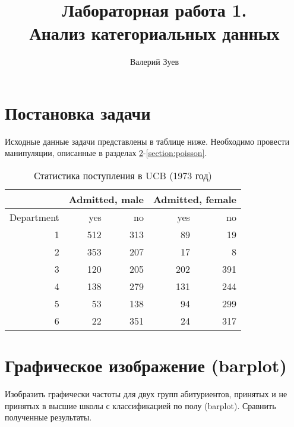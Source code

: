 \documentclass[a4paper,12pt]{article}
\begin{document}
\title{Лабораторная работа 1. \\
     Анализ категориальных данных}
\author{Валерий Зуев}
\maketitle

\setcounter{section}{-1}

\section{Постановка задачи}

Исходные данные задачи представлены в таблице ниже.
Необходимо провести манипуляции, описанные в разделах \ref{section:barplot}-\ref{section:poisson}.

\begin{table}[ht]
    \centering
    \begin{tabular}{r|rr|rr}
        \hline
        & \multicolumn{2}{c}{Admitted, male} & \multicolumn{2}{c}{Admitted, female} \\
        \hline
        Department & yes & no & yes & no \\
        \hline
        1 & 512 & 313 &  89 &  19 \\
        2 & 353 & 207 &  17 &   8 \\
        3 & 120 & 205 & 202 & 391 \\
        4 & 138 & 279 & 131 & 244 \\
        5 &  53 & 138 &  94 & 299 \\
        6 &  22 & 351 &  24 & 317 \\
        \hline
    \end{tabular}
    \label{tbl:task}
    \caption{Статистика поступления в UCB (1973 год)}
\end{table}

\section{Графическое изображение (barplot)}
\label{section:barplot}

\begin{leftbar}
    Изобразить графически частоты для двух групп абитуриентов, принятых и не принятых в высшие школы с классификацией по полу (barplot).
    Сравнить полученные результаты.
\end{leftbar}
\end{document}
